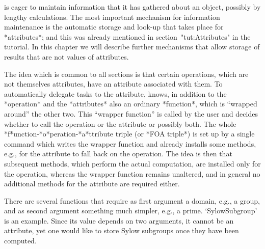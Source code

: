 
{\GAP}  is eager  to maintain information  that  it has gathered about an
object, possibly by lengthy  calculations. The most  important mechanism
for information maintenance  is the  automatic  storage and look-up  that
takes  place  for  *attributes*; and    this   was already mentioned   in
section~"tut:Attributes"  in the   tutorial. In   this  chapter  we  will
describe further mechanisms that  allow storage of  results that  are not
values of attributes.

%
The  idea which is   common to all  sections  is that certain operations,
which are  not themselves attributes, have  an attribute  associated with
them. To automatically delegate tasks to the  attribute, {\GAP} knows, in
addition  to  the *operation*  and  the  *attributes*   also an  ordinary
*function*, which  is  ``wrapped around'' the  other  two. This ``wrapper
function''  is called by    the user and    decides whether to  call  the
operation    or  the    attribute     or  possibly     both.   The  whole
*f*unction-*o*peration-*a*ttribute triple (or *FOA triple*)  is set up by
a single   {\GAP} command which  writes the  wrapper function and already
installs  some methods,  e.g.,  for the attribute  to   fall back on  the
operation. The idea  is then that subsequent  methods, which  perform the
actual computation, are installed   only for the operation,   whereas the
wrapper function remains unaltered, and  in general no additional methods
for the attribute are required either.



There  are several functions  that  require as first  argument a domain,
e.g., a  group, and as second  argument  something much simpler,  e.g., a
prime. `SylowSubgroup'  is an  example.
Since its value depends on two arguments, it cannot be an attribute,
yet one would like to store Sylow subgroups once they have been computed.

